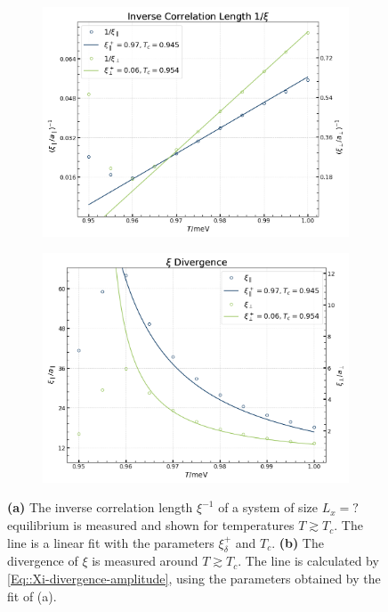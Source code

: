 	\begin{figure}[htp]
		\begin{subfigure}{0.5\textwidth}
			\centering
			\includegraphics[width=0.95\linewidth]{graphics/amplitude-inverse-xi.png}
		\end{subfigure}
		\begin{subfigure}{0.5\textwidth}
			\centering
			\includegraphics[width=0.95\linewidth]{graphics/amplitude-xi-divergence.png}
		\end{subfigure}
		\caption{\textbf{(a)} The inverse correlation length $\xi^{-1}$ of a system of size $L_x =	?$ equilibrium is measured and shown for temperatures $T \gtrsim T_c$. The line is a linear fit with the parameters $\xi_\delta^+$ and $T_c$. \textbf{(b)} The divergence of $\xi$ is measured around $T \gtrsim T_c$. The line is calculated by \autoref{Eq::Xi-divergence-amplitude}, using the parameters obtained by the fit of (a).}
		\label{Fig::Amplitude-Result}
	\end{figure}
